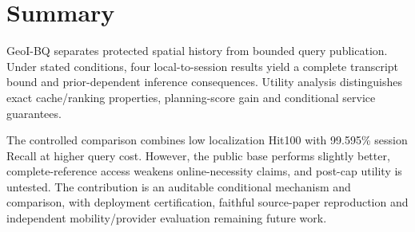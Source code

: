 \section{Summary}\label{sec:conclusion}
GeoI-BQ separates protected spatial history from bounded query publication.
Under stated conditions, four local-to-session results yield a complete
transcript bound and prior-dependent inference consequences. Utility analysis
distinguishes exact cache/ranking properties, planning-score gain and conditional
service guarantees.

The controlled comparison combines low localization Hit100 with 99.595\%
session Recall at higher query cost. However, the public base performs slightly
better, complete-reference access weakens online-necessity claims, and post-cap
utility is untested. The contribution is an auditable conditional mechanism and
comparison, with deployment certification, faithful source-paper reproduction
and independent mobility/provider evaluation remaining future work.
